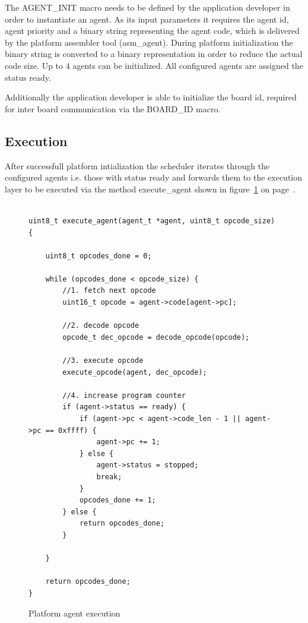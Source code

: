 \documentclass{scrreprt}
\begin{document}
\noindent
The AGENT_INIT macro needs to be defined by the application developer in order to instantiate an agent.
As its input parameters it requires the agent id, agent priority and a binary string representing the agent
code, which is delivered by the platform assembler tool (asm_agent). During platform initialization the binary
string is converted to a binary representation in order to reduce the actual code size.
Up to 4 agents can be initialized. All configured agents are assigned the status ready.

Additionally the application developer is able to initialize the board id,
required for inter board communication via the BOARD_ID macro.

\subsection{Execution}
After successfull platform intialization the scheduler iterates through the configured agents i.e. those with status ready and forwards them to
the execution layer to be executed via the method execute_agent shown in figure~\ref{fig:platform-agent-exec} on page~\pageref{fig:platform-agent-exec}.\\

\begin{figure}[!htb]
\lstset{language=C, tabsize=2}
\begin{lstlisting}[frame=single]

uint8_t execute_agent(agent_t *agent, uint8_t opcode_size) {

	uint8_t opcodes_done = 0;

	while (opcodes_done < opcode_size) {
		//1. fetch next opcode
		uint16_t opcode = agent->code[agent->pc];

		//2. decode opcode
		opcode_t dec_opcode = decode_opcode(opcode);

		//3. execute opcode
		execute_opcode(agent, dec_opcode);

		//4. increase program counter
		if (agent->status == ready) {
			if (agent->pc < agent->code_len - 1 || agent->pc == 0xffff) {
				agent->pc += 1;
			} else {
				agent->status = stopped;
				break;
			}
			opcodes_done += 1;
		} else {
			return opcodes_done;
		}

	}

	return opcodes_done;
}

\end{lstlisting}
\caption{Platform agent execution}
\label{fig:platform-agent-exec}
\end{figure}
\end{document}
